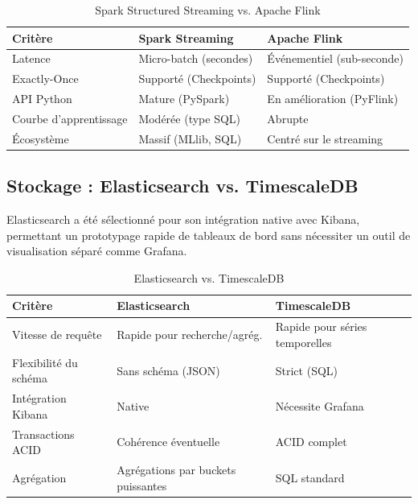 \documentclass[12pt, a4paper]{article}
\newcommand{\tablemark}[1]{\textbf{\color{accentdark}#1}}
\begin{document}
\begin{table}[htbp]
\centering
\caption{Spark Structured Streaming vs. Apache Flink}
\begin{tabular}{lll}
\toprule
\tablemark{Crit\`ere} & \tablemark{Spark Streaming} & \tablemark{Apache Flink} \\
\midrule
Latence & Micro-batch (secondes) & \'Ev\'enementiel (sub-seconde) \\
Exactly-Once & Support\'e (Checkpoints) & Support\'e (Checkpoints) \\
API Python & Mature (PySpark) & En am\'elioration (PyFlink) \\
Courbe d'apprentissage & Mod\'er\'ee (type SQL) & Abrupte \\
\'Ecosyst\`eme & Massif (MLlib, SQL) & Centr\'e sur le streaming \\
\bottomrule
\end{tabular}
\end{table}

\subsection{Stockage : Elasticsearch vs. TimescaleDB}
Elasticsearch a \'et\'e s\'electionn\'e pour son int\'egration native avec Kibana, permettant un prototypage rapide de tableaux de bord sans n\'ecessiter un outil de visualisation s\'epar\'e comme Grafana.

\begin{table}[htbp]
\centering
\caption{Elasticsearch vs. TimescaleDB}
\begin{tabular}{lll}
\toprule
\tablemark{Crit\`ere} & \tablemark{Elasticsearch} & \tablemark{TimescaleDB} \\
\midrule
Vitesse de requ\^ete & Rapide pour recherche/agr\'eg. & Rapide pour s\'eries temporelles \\
Flexibilit\'e du sch\'ema & Sans sch\'ema (JSON) & Strict (SQL) \\
Int\'egration Kibana & Native & N\'ecessite Grafana \\
Transactions ACID & Coh\'erence \'eventuelle & ACID complet \\
Agr\'egation & Agr\'egations par buckets puissantes & SQL standard \\
\bottomrule
\end{tabular}
\end{table}

\end{document}
